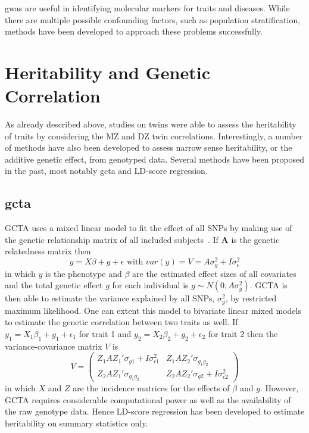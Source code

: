 \acrshort{gwas} are useful in identifying molecular markers for traits and diseases.
While there are multiple possible confounding factors, such as population stratification, methods have been developed to approach these problems successfully.


\section{Heritability and Genetic Correlation}
\label{sec:heritability_and_genetic_correlation}

As already described above, studies on twins were able to assess the heritability of traits by considering the MZ and DZ twin correlations.
Interestingly, a number of methods have also been developed to assess narrow sense heritability, or the additive genetic effect, from genotyped data.
Several methods have been proposed in the past, most notably \acrfull{gcta} and LD-score regression.

\subsection{\acrfull{gcta}}
\label{sub:gcta}

GCTA uses a mixed linear model to  fit the effect of all SNPs by making use of the genetic relationship matrix of all included subjects~\cite{Yang2011}.
If $\textbf{A}$ is the genetic relatedness matrix then
\begin{equation}
  y = X\beta + g + \epsilon \text{ with } var(y) = V = A\sigma^2_g + I\sigma^2_\epsilon
\end{equation}
in which $y$ is the phenotype and $\beta$ are the estimated effect sizes of all covariates and the total genetic effect $g$ for each individual is $g \sim N(0, A\sigma^2_g)$.
GCTA is then able to estimate the variance explained by all SNPs, $\sigma^2_g$, by restricted maximum likelihood.
One can extent this model to bivariate linear mixed models to estimate the genetic correlation between two traits as well.
If $y_1 = X_1\beta_1 + g_1 + \epsilon_1$ for trait 1 and $y_2= X_2\beta_2 + g_2 + \epsilon_2$ for trait 2 then the variance-covariance matrix $V$ is
\begin{equation}
  V = 
  \begin{pmatrix}
    Z_1AZ_1'\sigma_{g1} + I\sigma^2_{\epsilon 1} & Z_1AZ_2'\sigma_{g_1g_2} \\
    Z_2AZ_1'\sigma_{g_1g_2} & Z_2AZ_2'\sigma_{g2} + I\sigma^2_{\epsilon 2}
  \end{pmatrix}
\end{equation}
in which $X$ and $Z$ are the incidence matrices for the effects of $\beta$ and $g$.
However, GCTA requires considerable computational power as well as the availability of the raw genotype data.
Hence LD-score regression has been developed to estimate heritability on summary statistics only.

